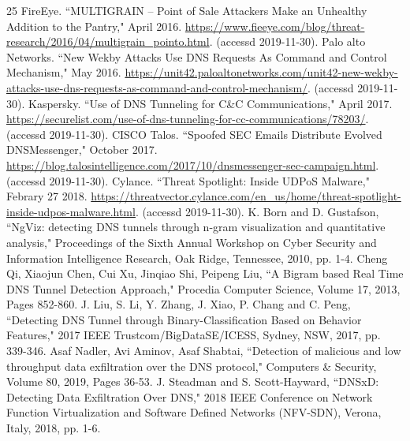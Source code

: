 \documentclass[12pt]{jarticle} %
\begin{document}
\begin{thebibliography} {25}
  FireEye. ``MULTIGRAIN – Point of Sale Attackers Make an Unhealthy Addition to the Pantry," April 2016. \href{https://www.fieeye.com/blog/threat-research/2016/04/multigrain\_pointo.html}{https://www.fieeye.com/blog/threat-research/2016/04/multigrain\_pointo.html}. (accessd 2019-11-30).
  Palo alto Networks. ``New Wekby Attacks Use DNS Requests As Command and Control Mechanism," May 2016. \href{https://unit42.paloaltonetworks.com/unit42-new-wekby-attacks-use-dns-requests-as-command-and-control-mechanism/}{https://unit42.paloaltonetworks.com/unit42-new-wekby-attacks-use-dns-requests-as-command-and-control-mechanism/}. (accessd 2019-11-30).
  Kaspersky. ``Use of DNS Tunneling for C\&C Communications," April 2017. \href{https://securelist.com/use-of-dns-tunneling-for-cc-communications/78203/}{https://securelist.com/use-of-dns-tunneling-for-cc-communications/78203/}. (accessd 2019-11-30).
  CISCO Talos. ``Spoofed SEC Emails Distribute Evolved DNSMessenger," October 2017. \href{https://blog.talosintelligence.com/2017/10/dnsmessenger-sec-campaign.html}{https://blog.talosintelligence.com/2017/10/dnsmessenger-sec-campaign.html}. (accessd 2019-11-30).
  Cylance. ``Threat Spotlight: Inside UDPoS Malware," Febrary 27 2018. \href{https://threatvector.cylance.com/en\_us/home/threat-spotlight-inside-udpos-malware.html}{https://threatvector.cylance.com/en\_us/home/threat-spotlight-inside-udpos-malware.html}. (accessd 2019-11-30).
  K. Born and D. Gustafson, ``NgViz: detecting DNS tunnels through n-gram visualization and quantitative analysis," Proceedings of the Sixth Annual Workshop on Cyber Security and Information Intelligence Research, Oak Ridge, Tennessee, 2010, pp. 1-4.
  Cheng Qi, Xiaojun Chen, Cui Xu, Jinqiao Shi, Peipeng Liu, ``A Bigram based Real Time DNS Tunnel Detection Approach," Procedia Computer Science, Volume 17, 2013, Pages 852-860.
  J. Liu, S. Li, Y. Zhang, J. Xiao, P. Chang and C. Peng, ``Detecting DNS Tunnel through Binary-Classification Based on Behavior Features," 2017 IEEE Trustcom/BigDataSE/ICESS, Sydney, NSW, 2017, pp. 339-346.
  Asaf Nadler, Avi Aminov, Asaf Shabtai, ``Detection of malicious and low throughput data exfiltration over the DNS protocol," Computers \& Security, Volume 80, 2019, Pages 36-53.
  J. Steadman and S. Scott-Hayward, ``DNSxD: Detecting Data Exfiltration Over DNS," 2018 IEEE Conference on Network Function Virtualization and Software Defined Networks (NFV-SDN), Verona, Italy, 2018, pp. 1-6.

\end{thebibliography}
\end{document}
